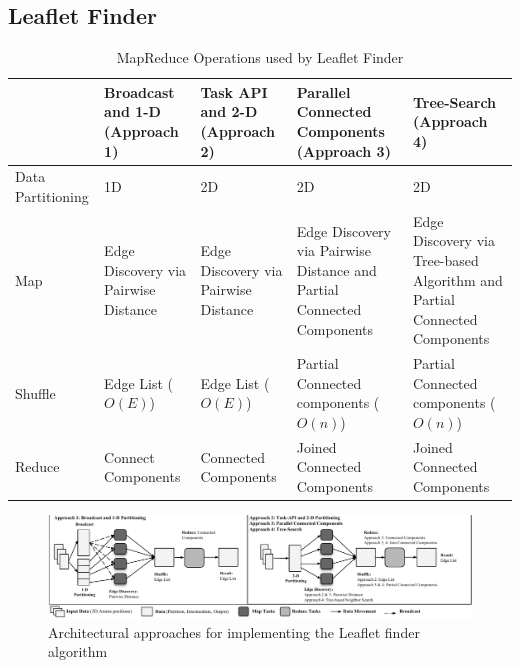 \subsection{Leaflet Finder}
\label{sec:leaflet}
\begin{table}[t]
    \centering
    \begin{tabular}{@{}p{2cm}|p{2.8cm}p{2.8cm}p{2.8cm}p{2.8cm}@{}}
        \toprule
        &
        \textbf{Broadcast and 1-D} (Approach 1) &
        \textbf{Task API and 2-D} (Approach 2) &
        \textbf{Parallel Connected Components} (Approach 3) &
        \textbf{Tree-Search} (Approach 4)\\
        \midrule
        Data Partitioning  & 
        1D  & 
        2D & 
        2D & 
        2D\\
        Map & 
        Edge Discovery via Pairwise Distance &
        Edge Discovery via Pairwise Distance &
        Edge Discovery via Pairwise Distance and Partial Connected Components & 
        Edge Discovery via Tree-based Algorithm and Partial Connected Components\\
        Shuffle &
        Edge List ($O(E)$) &
        Edge List ($O(E)$) &
        Partial Connected components ($O(n)$) &
        Partial Connected components ($O(n)$)\\
        Reduce   &
        Connect Components  &
        Connected Components &
        Joined Connected Components &
        Joined Connected Components\\
        \bottomrule
    \end{tabular}
    \caption{MapReduce Operations used by Leaflet Finder\label{tab:app_operators}}
\end{table}

\begin{figure}[t]
    \centering
    \includegraphics[width=.98\textwidth]{figures/data_analytics_hpc/task_par/lf_approaches.pdf}
    \caption{Architectural approaches for implementing the Leaflet finder algorithm\label{fig:lf_approaches}} 
\end{figure}

